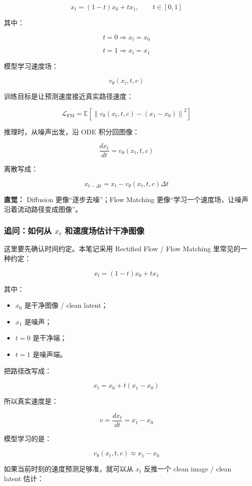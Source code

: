 \[
x_t = (1-t)x_0 + t x_1,
\qquad
t\in[0,1]
\]

其中：

\[
t=0 \Rightarrow x_t=x_0
\]

\[
t=1 \Rightarrow x_t=x_1
\]

模型学习速度场：

\[
v_\theta(x_t,t,c)
\]

训练目标是让预测速度接近真实路径速度：

\[
\mathcal{L}_\text{FM}
=
\mathbb{E}
\left[
\left\|
v_\theta(x_t,t,c)
-
(x_1-x_0)
\right\|^2
\right]
\]

推理时，从噪声出发，沿 ODE 积分回图像：

\[
\frac{dx_t}{dt}
=
v_\theta(x_t,t,c)
\]

离散写成：

\[
x_{t-\Delta t}
=
x_t
-
v_\theta(x_t,t,c)\Delta t
\]

\begin{intubox}
\textbf{直觉：} Diffusion 更像“逐步去噪”；Flow Matching 更像“学习一个速度场，让噪声沿着流动路径变成图像”。
\end{intubox}

\subsubsection{追问：如何从 $x_t$ 和速度场估计干净图像}

这里要先确认时间约定。本笔记采用 Rectified Flow / Flow Matching 里常见的一种约定：

\[
x_t = (1-t)x_0 + t x_1
\]

其中：

\begin{itemize}[leftmargin=1.5em]
  \item $x_0$ 是干净图像 / clean latent；
  \item $x_1$ 是噪声；
  \item $t=0$ 是干净端；
  \item $t=1$ 是噪声端。
\end{itemize}

把路径改写成：

\[
x_t = x_0 + t(x_1-x_0)
\]

所以真实速度是：

\[
v = \frac{dx_t}{dt} = x_1 - x_0
\]

模型学习的是：

\[
v_\theta(x_t,t,c) \approx x_1-x_0
\]

如果当前时刻的速度预测足够准，就可以从 $x_t$ 反推一个 clean image / clean latent 估计：

